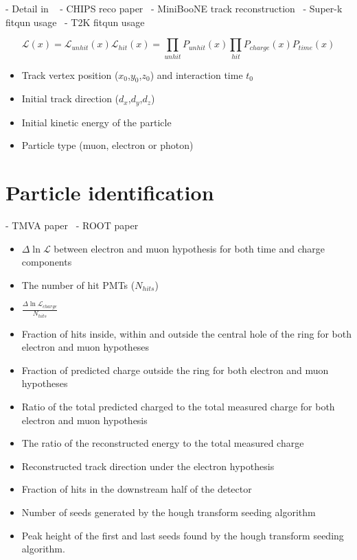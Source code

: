 - Detail in ~\cite{perch2017}
- CHIPS reco paper~\cite{blake2016}
- MiniBooNE track reconstruction~\cite{patterson2009}
- Super-k fitqun usage~\cite{jiang2019}
- T2K fitqun usage~\cite{missert2017}

\begin{equation} %
    \mathcal{L}(x)=\mathcal{L}_{unhit}(x)\mathcal{L}_{hit}(x)=\prod_{unhit}P_{unhit}(x)
    \prod_{hit}P_{charge}(x)P_{time}(x)
\end{equation}

\begin{itemize}
    \item Track vertex position ($x_{0}$,$y_{0}$,$z_{0}$) and interaction time $t_{0}$
    \item Initial track direction ($d_{x}$,$d_{y}$,$d_{z}$)
    \item Initial kinetic energy of the particle
    \item Particle type (muon, electron or photon)
\end{itemize}


\section{Particle identification} %
\label{sec:cvn_old_pid} %

- TMVA paper~\cite{hocker2007}
- ROOT paper~\cite{brun1997}

\begin{itemize}
    \item $\Delta\ln\mathcal{L}$ between electron and muon hypothesis for both time and charge
          components
    \item The number of hit PMTs ($N_{hits}$)
    \item $\frac{\Delta\ln\mathcal{L}_{charge}}{N_{hits}}$
    \item Fraction of hits inside, within and outside the central hole of the ring for
          both electron and muon hypotheses
    \item Fraction of predicted charge outside the ring for both electron and muon hypotheses
    \item Ratio of the total predicted charged to the total measured charge for both electron
          and muon hypothesis
    \item The ratio of the reconstructed energy to the total measured charge
    \item Reconstructed track direction under the electron hypothesis
    \item Fraction of hits in the downstream half of the detector

    \item Number of seeds generated by the hough transform seeding algorithm
    \item Peak height of the first and last seeds found by the hough transform seeding algorithm.
\end{itemize}

